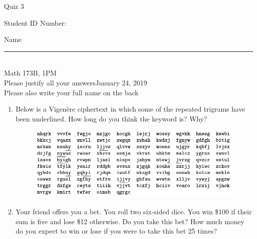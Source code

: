 \documentclass[12pt]{article}
\begin{document}
\begin{flushleft} 
\centerline{\LARGE{Quiz 3}} 
\vspace{5 mm}
{Student ID Number:}\hfill  
{Name \rule {2 in}{0.01in}}\\
Math 173B, 1PM
\\
{Please justify all your answers}\hfill {January 24, 2019}
\\
{Please also write your full name on the back} 

\medskip
\end{flushleft}

\begin{enumerate}
	\item Below is a Vigen\`ere ciphertext in which some of the repeated trigrams have been underlined. How long do you think the keyword is? Why?

	\begin{figure}[h]
	\centering
		\includegraphics[scale=.5]{vig.png}
	\end{figure}
	\vfill

	\item Your friend offers you a bet. You roll two six-sided dice. You win \$100 if their sum is five and lose \$12 otherwise. Do you take this bet? How much money do you expect to win or lose if you were to take this bet 25 times?

	\vfill
\end{enumerate}

\end{document}
